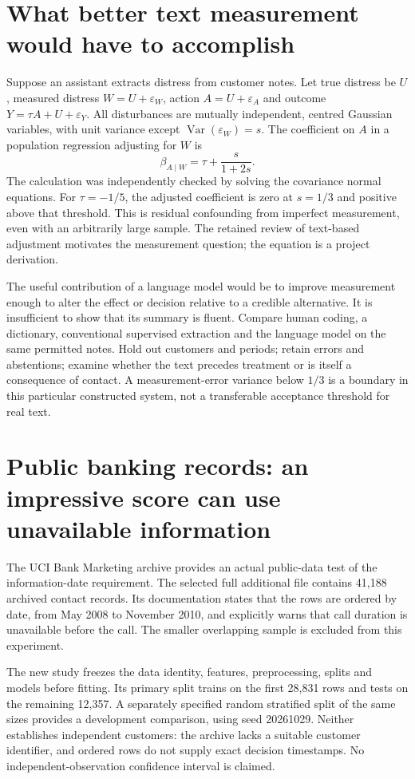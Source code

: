 \section{What better text measurement would have to accomplish}
Suppose an assistant extracts distress from customer notes. Let true distress
be $U$, measured distress $W=U+\varepsilon_W$, action $A=U+\varepsilon_A$ and
outcome $Y=\tau A+U+\varepsilon_Y$. All disturbances are mutually independent,
centred Gaussian variables, with unit variance except
$\operatorname{Var}(\varepsilon_W)=s$. The coefficient on $A$ in a population
regression adjusting for $W$ is
\[
 \beta_{A\mid W}=\tau+\frac{s}{1+2s}.
\]
The calculation was independently checked by solving the covariance normal
equations. For $\tau=-1/5$, the adjusted coefficient is zero at $s=1/3$ and
positive above that threshold. This is residual confounding from imperfect
measurement, even with an arbitrarily large sample. The retained review of
text-based adjustment motivates the measurement question; the equation is
a project derivation.
\citep{exec13_census_text_review_arxiv}

The useful contribution of a language model would be to improve measurement
enough to alter the effect or decision relative to a credible alternative.
It is insufficient to show that its summary is fluent. Compare human coding,
a dictionary, conventional supervised extraction and the language model on
the same permitted notes. Hold out customers and periods; retain errors and
abstentions; examine whether the text precedes treatment or is itself a
consequence of contact. A measurement-error variance below $1/3$ is a boundary
in this particular constructed system, not a transferable acceptance threshold
for real text.

\section{Public banking records: an impressive score can use unavailable information}
The UCI Bank Marketing archive provides an actual public-data test of the
information-date requirement. The selected full additional file contains
41,188 archived contact records. Its documentation states that the rows are
ordered by date, from May 2008 to November 2010, and explicitly warns that
call duration is unavailable before the call. The smaller overlapping sample
is excluded from this experiment.
\citep{pd15_uci_bank}

The new study freezes the data identity, features, preprocessing, splits and
models before fitting. Its primary split trains on the first 28,831 rows and
tests on the remaining 12,357. A separately specified random stratified split
of the same sizes provides a development comparison, using seed 20261029.
Neither establishes independent customers: the archive lacks a suitable
customer identifier, and ordered rows do not supply exact decision timestamps.
No independent-observation confidence interval is claimed.

